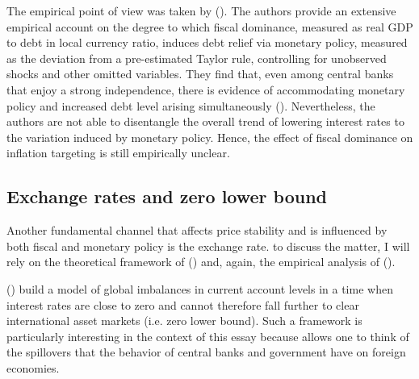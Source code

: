 \documentclass[american]{scrartcl}
\newcommand{\citein}[1]{\citeauthor{#1} (\citeyear{#1})}
\begin{document}
The empirical point of view was taken by \citein{Ahmed2021}. The authors provide an extensive empirical account on the degree to which fiscal dominance, measured as real GDP to debt in local currency ratio, induces debt relief via monetary policy, measured as the deviation from a pre-estimated Taylor rule, controlling for unobserved shocks and other omitted variables. They find that, even among central banks that enjoy a strong independence, there is evidence of accommodating monetary policy and increased debt level arising simultaneously (\cite[p. 19]{Ahmed2021}). Nevertheless, the authors are not able to disentangle the overall trend of lowering interest rates to the variation induced by monetary policy. Hence, the effect of fiscal dominance on inflation targeting is still empirically unclear.

\subsection{Exchange rates and zero lower bound} \label{caballero}

Another fundamental channel that affects price stability and is influenced by both fiscal and monetary policy is the exchange rate. to discuss the matter, I will rely on the theoretical framework of \citein{Caballero2016} and, again, the empirical analysis of \citein{Ahmed2021}.

\citein{Caballero2016} build a model of global imbalances in current account levels in a time when interest rates are close to zero and cannot therefore fall further to clear international asset markets (i.e. zero lower bound). Such a framework is particularly interesting in the context of this essay because allows one to think of the spillovers that the behavior of central banks and government have on foreign economies.
\end{document}
